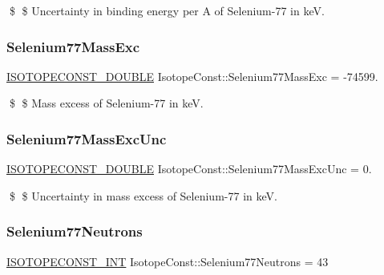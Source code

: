 \$ \$ Uncertainty in binding energy per A of Selenium-\/77 in keV. \mbox{\label{group___isotope_const-_selenium-_se77_ga4081e9c2187856b0510f08ff90139c06}} 
\subsubsection{\texorpdfstring{Selenium77\+Mass\+Exc}{Selenium77MassExc}}
{\footnotesize\ttfamily \mbox{\hyperlink{group___isotope_const-_macros_ga8f45a7272ce02c0b4c65c44636ed719a}{I\+S\+O\+T\+O\+P\+E\+C\+O\+N\+S\+T\+\_\+\+D\+O\+U\+B\+LE}} Isotope\+Const\+::\+Selenium77\+Mass\+Exc = -\/74599.}

\$ \$ Mass excess of Selenium-\/77 in keV. \mbox{\label{group___isotope_const-_selenium-_se77_ga51264962c6071117dae635bc2b4a3f86}} 
\subsubsection{\texorpdfstring{Selenium77\+Mass\+Exc\+Unc}{Selenium77MassExcUnc}}
{\footnotesize\ttfamily \mbox{\hyperlink{group___isotope_const-_macros_ga8f45a7272ce02c0b4c65c44636ed719a}{I\+S\+O\+T\+O\+P\+E\+C\+O\+N\+S\+T\+\_\+\+D\+O\+U\+B\+LE}} Isotope\+Const\+::\+Selenium77\+Mass\+Exc\+Unc = 0.}

\$ \$ Uncertainty in mass excess of Selenium-\/77 in keV. \mbox{\label{group___isotope_const-_selenium-_se77_ga67169e36cdd1ae93a0e13e32b9b8ad3d}} 
\subsubsection{\texorpdfstring{Selenium77\+Neutrons}{Selenium77Neutrons}}
{\footnotesize\ttfamily \mbox{\hyperlink{group___isotope_const-_macros_ga5f18360b3e99483a35c32d789e62621c}{I\+S\+O\+T\+O\+P\+E\+C\+O\+N\+S\+T\+\_\+\+I\+NT}} Isotope\+Const\+::\+Selenium77\+Neutrons = 43}

